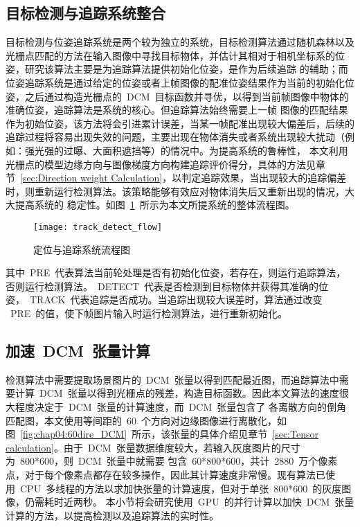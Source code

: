 \subsection{目标检测与追踪系统整合}
\label{sec:object_detect_track_union}
目标检测与位姿追踪系统是两个较为独立的系统，目标检测算法通过随机森林以及光栅点匹配的方法在输入图像中寻找目标物体，并估计其相对于相机坐标系的位姿，研究该算法主要是为追踪算法提供初始化位姿，是作为后续追踪
的辅助；而位姿追踪系统是通过给定的位姿或者上帧图像的配准位姿结果作为当前的初始化位姿，之后通过构造光栅点的~DCM~目标函数并寻优，以得到当前帧图像中物体的准确位姿，追踪算法是系统的核心。但追踪算法始终需要上一帧
图像的匹配结果作为初始位姿，该方法将会引进累计误差，当某一帧配准出现较大偏差后，后续的追踪过程将容易出现失效的问题，主要出现在物体消失或者系统出现较大扰动（例如：强光强的过曝、大面积遮挡等）的情况中。为提高系统的鲁棒性，
本文利用光栅点的模型边缘方向与图像梯度方向构建追踪评价得分，具体的方法见章节~\ref{sec:Direction weight Calculation}，以判定追踪效果，当出现较大的追踪偏差时，则重新运行检测算法。该策略能够有效应对物体消失后又重新出现的情况，大大提高系统的
稳定性。如图~\ref{fig:chap04:detect_track_flow}~所示为本文所提系统的整体流程图。
\begin{figure}[b] %
  \centering%
    \texttt{[image: track\_detect\_flow]}
  \caption{定位与追踪系统流程图}
    \label{fig:chap04:detect_track_flow}
\end{figure}

其中~PRE~代表算法当前轮处理是否有初始化位姿，若存在，则运行追踪算法，否则运行检测算法。~DETECT~代表是否检测到目标物体并获得其准确的位姿，~TRACK~代表追踪是否成功。当追踪出现较大误差时，算法通过改变
~PRE~的值，使下帧图片输入时运行检测算法，进行重新初始化。
\subsection{加速~DCM~张量计算}
\label{sec:DCM_tensor_cal_speed_up}
检测算法中需要提取场景图片的~DCM~张量以得到匹配最近图，而追踪算法中需要计算~DCM~张量以得到光栅点的残差，构造目标函数。因此本文算法的速度很大程度决定于~DCM~张量的计算速度，而~DCM~张量包含了
各离散方向的倒角匹配图，本文使用等间距的~60~个方向对边缘图像进行离散化，如图~\ref{fig:chap04:60dire_DCM}~所示，该张量的具体介绍见章节~\ref{sec:Tensor calculation}。由于~DCM~张量数据维度较大，若输入灰度图片的尺寸为~800*600，则~DCM~张量中就需要
包含~60*800*600，共计~2880~万个像素点，对于每个像素点都存在较多操作，因此其计算速度非常慢。现有算法已使用~CPU~多线程的方法以求加快张量的计算速度，但对于单张~800*600~的灰度图像，仍需耗时近两秒。
本小节将会研究使用~GPU~的并行计算以加快~DCM~张量计算的方法，以提高检测以及追踪算法的实时性。

